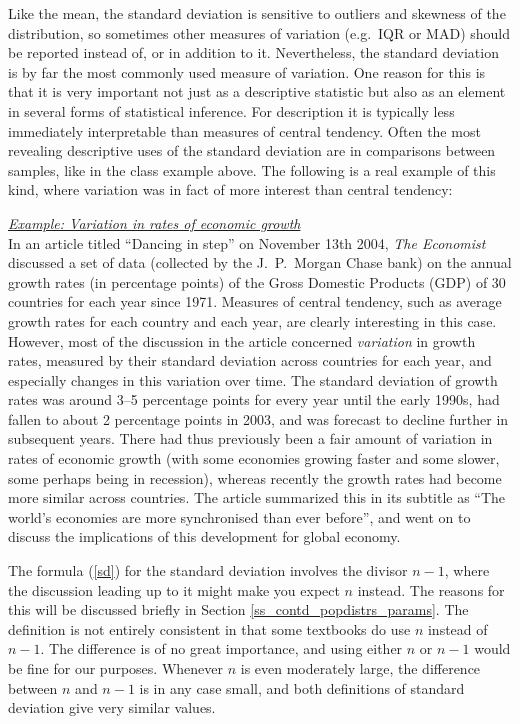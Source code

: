 Like the mean, the standard deviation is sensitive to outliers and
skewness of the distribution, so sometimes other measures of variation
(e.g.\ IQR or MAD) should be reported instead of, or in addition to it.
Nevertheless, the standard deviation is by far the most commonly used
measure of variation. One reason for this is that it is very important
not just as a descriptive statistic but also as an element in
several forms of statistical inference. For description it is typically
less immediately interpretable than measures of central tendency. Often
the most revealing descriptive uses of the standard deviation are in
comparisons between samples, like in the class example above. The
following is a real
example of this kind, where variation was in fact of more interest
than central tendency:

\underline{\emph{Example: Variation in rates of economic growth}}\\ In
an article titled ``Dancing in step'' on November 13th 2004, \emph{The
Economist} discussed a set of data (collected by the J.\ P.\
Morgan Chase bank) on the annual growth rates (in percentage
points) of the Gross Domestic Products (GDP) of 30 countries for each
year since 1971. Measures of central tendency, such as average growth
rates for each country and each year, are clearly interesting in this
case. However, most of the discussion in the article concerned
\emph{variation} in growth rates, measured by their standard deviation
across countries for each year, and especially changes in this variation
over time. The standard deviation of growth rates was around 3--5
percentage points for every year until the early 1990s, had fallen to
about 2 percentage points in 2003, and was forecast to decline further
in subsequent years. There had thus previously been a fair amount of
variation in rates of economic growth (with some economies growing
faster and some slower, some perhaps being in recession), whereas
recently the growth rates had become more similar across countries. The
article summarized this in its subtitle as ``The world's economies are
more synchronised than ever before'', and went on to discuss
the implications of this development for global economy.

The formula (\ref{sd}) for the standard deviation involves the divisor
$n-1$, where the discussion leading up to it might make you expect $n$
instead. The reasons for this will be discussed briefly in Section
\ref{ss_contd_popdistrs_params}. The definition is not entirely consistent in that
some textbooks do use $n$ instead of $n-1$. The difference is of no
great importance, and using either $n$ or $n-1$ would be fine for our
purposes. Whenever $n$ is even moderately large, the difference between
$n$ and $n-1$ is in any case small, and both definitions of standard
deviation give very similar values.

